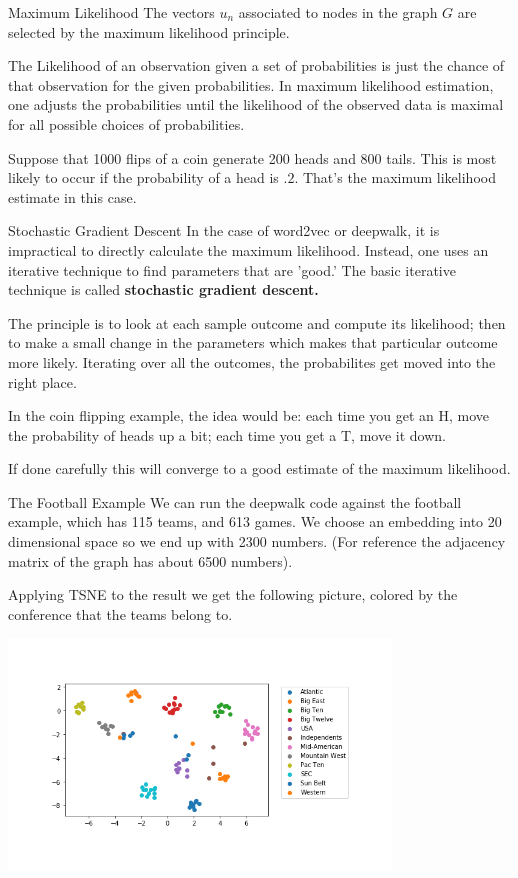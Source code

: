 \documentclass{beamer}
\begin{document}
  \begin{frame}{Maximum Likelihood}
    The vectors $u_n$ associated to nodes in the graph $G$ are selected by the maximum likelihood principle.

    \bigskip\noindent
    The Likelihood of an observation given a set of probabilities is just the chance of that observation for the given probabilities. In maximum likelihood estimation, one adjusts the probabilities until the likelihood of the observed data is maximal for all possible choices of probabilities.

    \bigskip\noindent
    Suppose that  1000 flips of a coin generate 200 heads and 800 tails.  This is most likely to occur if the probability of a head is $.2$.  That's the maximum likelihood estimate in this case.
  \end{frame}
  \begin{frame}{Stochastic Gradient Descent}
    In the case of word2vec or deepwalk, it is impractical to  directly calculate the maximum likelihood. Instead, one uses an iterative technique to find parameters that are 'good.'  The basic iterative technique is called \textbf{stochastic gradient descent.}

    \bigskip\noindent
    The principle is to look at each sample outcome and compute its likelihood; then to make a small change in the parameters which makes that particular outcome more likely.  Iterating over all the outcomes, the probabilites get moved into the right place.

    \bigskip\noindent
    In the coin flipping example, the idea would be: each time you get an H, move the probability of heads up a bit; each time you get a T, move it down.

    \bigskip\noindent
    If done carefully this will converge to a good estimate of the maximum likelihood.
  \end{frame}
  \begin{frame}{The Football Example}
    We can run the deepwalk code against the football example, which has 115 teams, and 613 games.  We choose
    an embedding into 20 dimensional space so we end up with 2300 numbers.
    (For reference the adjacency matrix of the graph has about 6500 numbers).

    Applying TSNE to the result we get the following picture, colored by the conference that the teams belong to.

    \includegraphics[width=4in]{football_clusters.png}
 \end{frame}
\end{document}
